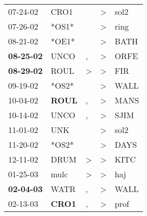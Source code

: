 \begin{supertabular}{p{0.07\textwidth}p{0.06\textwidth}p{0.02\textwidth}p{0.02\textwidth}p{0.06\textwidth}}
          07-24-02\textsuperscript{} &           CRO1\textsuperscript{} &                  &     \textgreater &           sol2\textsuperscript{} \\
          07-26-02\textsuperscript{} &                            *OS1* &                  &     \textgreater &           ring\textsuperscript{} \\
          08-21-02\textsuperscript{} &                            *OE1* &                  &     \textgreater &           BATH\textsuperscript{} \\
 \textbf{08-25-02\textsuperscript{}} &           UNCO\textsuperscript{} &                , &     \textgreater &           ORFE\textsuperscript{} \\
 \textbf{08-29-02\textsuperscript{}} &           ROUL\textsuperscript{} &     \textgreater &     \textgreater &            FIR\textsuperscript{} \\
          09-19-02\textsuperscript{} &                            *OS2* &                  &     \textgreater &           WALL\textsuperscript{} \\
          10-04-02\textsuperscript{} &  \textbf{ROUL\textsuperscript{}} &                , &     \textgreater &           MANS\textsuperscript{} \\
          10-14-02\textsuperscript{} &           UNCO\textsuperscript{} &                , &     \textgreater &           SJIM\textsuperscript{} \\
          11-01-02\textsuperscript{} &            UNK\textsuperscript{} &                  &     \textgreater &           sol2\textsuperscript{} \\
          11-20-02\textsuperscript{} &                            *OS2* &                  &     \textgreater &           DAYS\textsuperscript{} \\
          12-11-02\textsuperscript{} &           DRUM\textsuperscript{} &     \textgreater &     \textgreater &           KITC\textsuperscript{} \\
          01-25-03\textsuperscript{} &           mulc\textsuperscript{} &     \textgreater &     \textgreater &            haj\textsuperscript{} \\
 \textbf{02-04-03\textsuperscript{}} &           WATR\textsuperscript{} &                , &     \textgreater &           WALL\textsuperscript{} \\
          02-13-03\textsuperscript{} &  \textbf{CRO1\textsuperscript{}} &                , &     \textgreater &           prof\textsuperscript{} \\

\end{supertabular}
